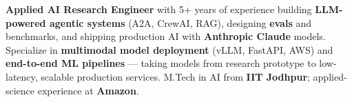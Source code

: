 \documentclass[letter,10pt]{article}
\begin{document}

\textbf{Applied AI Research Engineer} with 5+ years of experience building \textbf{LLM-powered agentic systems} (A2A, CrewAI, RAG), designing \textbf{evals} and benchmarks, and shipping production AI with \textbf{Anthropic Claude} models.
Specialize in \textbf{multimodal model deployment} (vLLM, FastAPI, AWS) and \textbf{end-to-end ML pipelines} — taking models from research prototype to low-latency, scalable production services.
M.Tech in AI from \textbf{IIT Jodhpur}; applied-science experience at \textbf{Amazon}.
\end{document}
